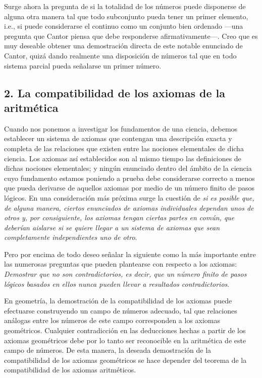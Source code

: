 \documentclass[a4paper, 12pt]{article}
\begin{document}
Surge ahora la pregunta de si la totalidad de los números puede disponerse de alguna otra manera tal que todo subconjunto pueda tener un primer elemento, i.e., si puede considerarse el continuo como un conjunto bien ordenado ---una pregunta que Cantor piensa que debe responderse afirmativamente---. Creo que es muy deseable obtener una demostración directa de este notable enunciado de Cantor, quizá dando realmente una disposición de números tal que en todo sistema parcial pueda señalarse un primer número. 


\subsection*{2. La compatibilidad de los axiomas de la aritmética}
 
Cuando nos ponemos a investigar los fundamentos de una ciencia, debemos establecer un sistema de axiomas que contengan una descripción exacta y completa de las relaciones que existen entre las nociones elementales de dicha ciencia. Los axiomas así establecidos son al mismo tiempo las definiciones de dichas nociones elementales; y ningún enunciado dentro del ámbito de la ciencia cuyo fundamento estamos poniendo a prueba debe considerarse correcto a menos que pueda derivarse de aquellos axiomas por medio de un número finito de pasos lógicos. En una consideración más próxima surge la cuestión de \textit{si es posible que, de alguna manera, ciertos enunciados de axiomas individuales dependan unos de otros y, por consiguiente, los axiomas tengan ciertas partes en común, que deberían aislarse si se quiere llegar a un sistema de axiomas que sean completamente independientes uno de otro}. 
 
Pero por encima de todo deseo señalar la siguiente como la más importante entre las numerosas preguntas que pueden plantearse con respecto a los axiomas: \textit{Demostrar que no son contradictorios, es decir, que un número finito de pasos lógicos basados en ellos nunca pueden llevar  a resultados contradictorios}. 
 
En geometría, la demostración de la compatibilidad de los axiomas puede efectuarse construyendo un campo de números adecuado, tal que relaciones análogas entre los números de este campo corresponden a los axiomas geométricos. Cualquier contradicción en las deducciones hechas a partir de los axiomas geométricos debe por lo tanto ser reconocible en la aritmética de este campo de números. De esta manera, la deseada demostración de la compatibilidad de los axiomas geométricos se hace depender del teorema de la compatibilidad de los axiomas aritméticos. 
\end{document}
